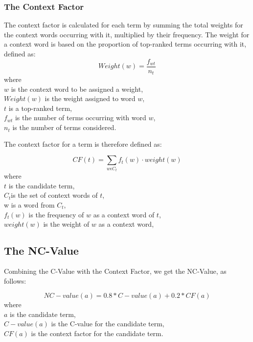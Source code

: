 \subsubsection{The Context Factor}
The context factor is calculated for each term by summing the total
weights for the context words occurring with it, multiplied by their frequency. The weight for a
context word is based on the proportion of top-ranked terms occurring with it,
defined as:
\begin{equation}\label{Weight}
Weight(w) = \frac{f_{wt}}{n_t}
\end{equation}
where\\
\indent \(w\) is the context word to be assigned a weight,\\
\indent \(Weight(w)\) is the weight assigned to word \(w\),\\
\indent \(t\) is a top-ranked term,\\
\indent \(f_{wt}\) is the number of terms occurring with word \(w\),\\
\indent \(n_t\) is the number of terms considered.
\vspace{\baselineskip}

The context factor for a term is therefore defined as:

\begin{equation}\label{CF}
CF(t) = \sum_{w \epsilon C_t} f_t(w) \cdot weight (w)
\end{equation}
where\\
\indent \(t\) is the candidate term,\\
\indent \(C_t \)is the set of context words of \(t\),\\
\indent w is a word from \(C_t\),\\
\indent \(f_t(w)\) is the frequency of \(w\) as a context word of \(t\),\\
\indent \(weight(w)\) is the weight of \(w\) as a context word,
\vspace{\baselineskip}

\subsection{The NC-Value}
Combining the C-Value with the Context Factor, we get the NC-Value, as
follows:

\begin{equation}\label{NCV}
NC-value(a) = 0.8 * C-value(a) + 0.2 * CF(a)
\end{equation}
where\\
\indent \(a\) is the candidate term,\\
\indent \(C-value(a)\) is the C-value for the candidate term,\\
\indent \(CF(a)\) is the context factor for the candidate term.
\vspace{\baselineskip}
 
